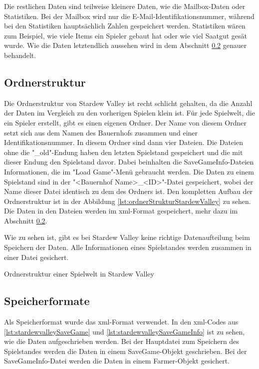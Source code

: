 Die restlichen Daten sind teilweise kleinere Daten, wie die Mailbox-Daten oder Statistiken. Bei der Mailbox wird nur die E-Mail-Identifikationsnummer, während bei den Statistiken hauptsächlich Zahlen gespeichert werden. Statistiken wären zum Beispiel, wie viele Items ein Spieler gebaut hat oder wie viel Saatgut gesät wurde. Wie die Daten letztendlich aussehen wird in dem Abschnitt \ref{ssec:speicherformateStardew} genauer behandelt.



\subsection{Ordnerstruktur}
Die Ordnerstruktur von Stardew Valley ist recht schlicht gehalten, da die Anzahl der Daten im Vergleich zu den vorherigen Spielen klein ist. Für jede Spielwelt, die ein Spieler erstellt, gibt es einen eigenen Ordner. Der Name von diesem Ordner setzt sich aus dem Namen des Bauernhofs zusammen und einer Identifikationsnummer. In diesem Ordner sind dann vier Dateien. Die Dateien ohne die "\_old"-Endung haben den letzten Spielstand gespeichert und die mit dieser Endung den Spielstand davor. Dabei beinhalten die SaveGameInfo-Dateien Informationen, die im "Load Game"-Menü gebraucht werden. Die Daten zu einem Spielstand sind in der "<Bauernhof Name>\_<ID>"-Datei gespeichert, wobei der Name dieser Datei identisch zu dem des Ordners ist. Den kompletten Aufbau der Ordnerstruktur ist in der Abbildung \ref{lst:ordnerStrukturStardewValley} zu sehen. Die Daten in den Dateien werden im \ac{xml}-Format gespeichert, mehr dazu im Abschnitt \ref{ssec:speicherformateStardew}.\cite{stardewvalleywikiSaves}\cite{stardewvalleyFiles}

Wie zu sehen ist, gibt es bei Stardew Valley keine richtige Datenaufteilung beim Speichern der Daten. Alle Informationen eines Spielstandes werden zusammen in einer Datei gesichert.

\begin{listing}[htp]
    \caption{Ordnerstruktur einer Spielwelt in Stardew Valley}
    \label{lst:ordnerStrukturStardewValley}
\end{listing}

\subsection{Speicherformate} \label{ssec:speicherformateStardew}
Als Speicherformat wurde das \ac{xml}-Format verwendet. In den \ac{xml}-Codes aus \ref{lst:stardewvalleySaveGame} und \ref{lst:stardewvalleySaveGameInfo} ist zu sehen, wie die Daten aufgeschrieben werden. Bei der Hauptdatei zum Speichern des Spielstandes werden die Daten in einem SaveGame-Objekt geschrieben. Bei der SaveGameInfo-Datei werden die Daten in einem Farmer-Objekt gesichert.\cite{stardewvalleywikiSaves}

